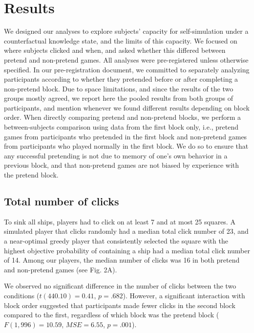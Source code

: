 \documentclass[10pt, letterpaper]{article}
\begin{document}
\hypertarget{results}{%
\section{Results}\label{results}}

We designed our analyses to explore subjects' capacity for
self-simulation under a counterfactual knowledge state, and the limits
of this capacity. We focused on where subjects clicked and when, and
asked whether this differed between pretend and non-pretend games. All
analyses were pre-registered unless otherwise specified. In our
pre-registration document, we committed to separately analyzing
participants according to whether they pretended before or after
completing a non-pretend block. Due to space limitations, and since the
results of the two groups mostly agreed, we report here the pooled
results from both groups of participants, and mention whenever we found
different results depending on block order. When directly comparing
pretend and non-pretend blocks, we perform a between-subjects comparison
using data from the first block only, i.e., pretend games from
participants who pretended in the first block and non-pretend games from
participants who played normally in the first block. We do so to ensure
that any successful pretending is not due to memory of one's own
behavior in a previous block, and that non-pretend games are not biased
by experience with the pretend block.

\hypertarget{total-number-of-clicks}{%
\subsection{Total number of clicks}\label{total-number-of-clicks}}

To sink all ships, players had to click on at least 7 and at most 25
squares. A simulated player that clicks randomly had a median total
click number of 23, and a near-optimal greedy player that consistently
selected the square with the highest objective probability of containing
a ship had a median total click number of 14. Among our players, the
median number of clicks was 16 in both pretend and non-pretend games
(see Fig. 2A).

We observed no significant difference in the number of clicks between
the two conditions (\(t(440.10) = 0.41\), \(p = .682\)). However, a
significant interaction with block order suggested that participants
made fewer clicks in the second block compared to the first, regardless
of which block was the pretend block (\(F(1, 996) = 10.59\),
\(\mathit{MSE} = 6.55\), \(p = .001\)).
\end{document}
